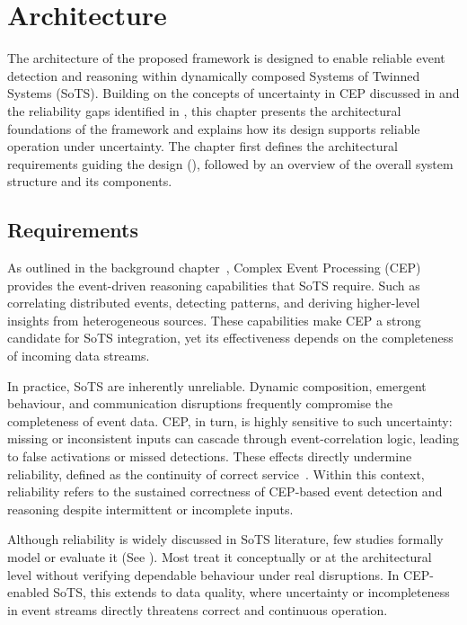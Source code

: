 \chapter{Architecture}\label{ch:architecture}

The architecture of the proposed framework is designed to enable reliable event detection and reasoning within dynamically composed Systems of Twinned Systems (SoTS).  
Building on the concepts of uncertainty in CEP discussed in  and the reliability gaps identified in , this chapter presents the architectural foundations of the framework and explains how its design supports reliable operation under uncertainty.
The chapter first defines the architectural requirements guiding the design (), followed by an overview of the overall system structure and its components.

\section{Requirements}\label{sec:arch-reqs}

As outlined in the background chapter~, Complex Event Processing (CEP) provides the event-driven reasoning capabilities that SoTS require. Such as correlating distributed events, detecting patterns, and deriving higher-level insights from heterogeneous sources. These capabilities make CEP a strong candidate for SoTS integration, yet its effectiveness depends on the completeness of incoming data streams.

In practice, SoTS are inherently unreliable. Dynamic composition, emergent behaviour, and communication disruptions frequently compromise the completeness of event data. CEP, in turn, is highly sensitive to such uncertainty: missing or inconsistent inputs can cascade through event-correlation logic, leading to false activations or missed detections. These effects directly undermine reliability, defined as the continuity of correct service~\cite{avizienis2004basic}. Within this context, reliability refers to the sustained correctness of CEP-based event detection and reasoning despite intermittent or incomplete inputs.

Although reliability is widely discussed in SoTS literature, few studies formally model or evaluate it (See ). Most treat it conceptually or at the architectural level without verifying dependable behaviour under real disruptions. In CEP-enabled SoTS, this extends to data quality, where uncertainty or incompleteness in event streams directly threatens correct and continuous operation.

